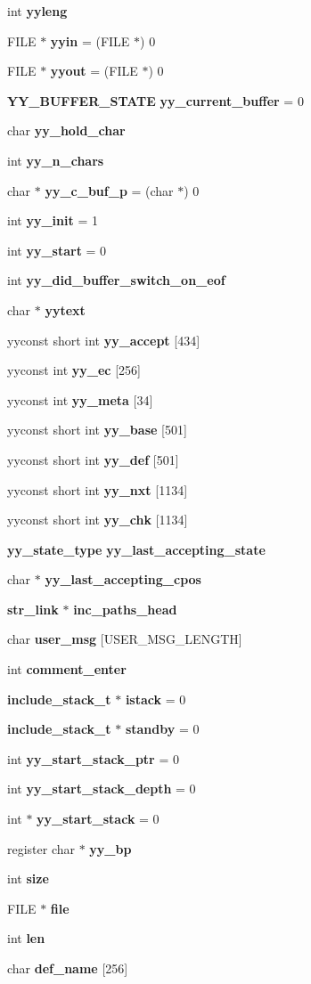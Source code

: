 \begin{CompactItemize}
\item 
int {\bf yyleng}
\item 
FILE $\ast$ {\bf yyin} = (FILE $\ast$) 0
\item 
FILE $\ast$ {\bf yyout} = (FILE $\ast$) 0
\item 
{\bf YY\_\-BUFFER\_\-STATE} {\bf yy\_\-current\_\-buffer} = 0
\item 
char {\bf yy\_\-hold\_\-char}
\item 
int {\bf yy\_\-n\_\-chars}
\item 
char $\ast$ {\bf yy\_\-c\_\-buf\_\-p} = (char $\ast$) 0
\item 
int {\bf yy\_\-init} = 1
\item 
int {\bf yy\_\-start} = 0
\item 
int {\bf yy\_\-did\_\-buffer\_\-switch\_\-on\_\-eof}
\item 
char $\ast$ {\bf yytext}
\item 
yyconst short int {\bf yy\_\-accept} [434]
\item 
yyconst int {\bf yy\_\-ec} [256]
\item 
yyconst int {\bf yy\_\-meta} [34]
\item 
yyconst short int {\bf yy\_\-base} [501]
\item 
yyconst short int {\bf yy\_\-def} [501]
\item 
yyconst short int {\bf yy\_\-nxt} [1134]
\item 
yyconst short int {\bf yy\_\-chk} [1134]
\item 
{\bf yy\_\-state\_\-type} {\bf yy\_\-last\_\-accepting\_\-state}
\item 
char $\ast$ {\bf yy\_\-last\_\-accepting\_\-cpos}
\item 
{\bf str\_\-link} $\ast$ {\bf inc\_\-paths\_\-head}
\item 
char {\bf user\_\-msg} [USER\_\-MSG\_\-LENGTH]
\item 
int {\bf comment\_\-enter}
\item 
{\bf include\_\-stack\_\-t} $\ast$ {\bf istack} = 0
\item 
{\bf include\_\-stack\_\-t} $\ast$ {\bf standby} = 0
\item 
int {\bf yy\_\-start\_\-stack\_\-ptr} = 0
\item 
int {\bf yy\_\-start\_\-stack\_\-depth} = 0
\item 
int $\ast$ {\bf yy\_\-start\_\-stack} = 0
\item 
register char $\ast$ {\bf yy\_\-bp}
\item 
int {\bf size}
\item 
FILE $\ast$ {\bf file}
\item 
int {\bf len}
\item 
char {\bf def\_\-name} [256]
\end{CompactItemize}


